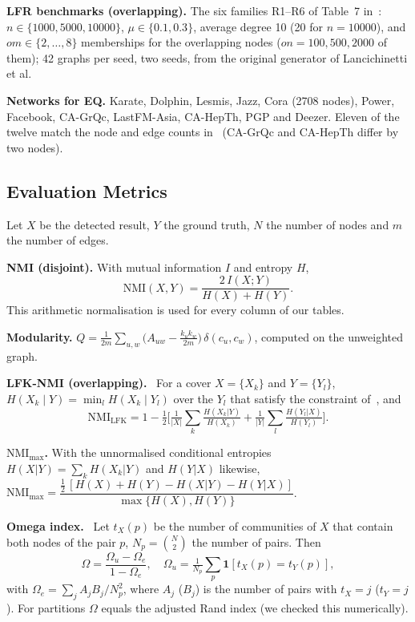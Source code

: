 \documentclass[conference]{IEEEtran}
\begin{document}
\textbf{LFR benchmarks (overlapping).} The six families R1--R6 of Table~7 in~\cite{kong2026}: $n\in\{1000,5000,10000\}$, $\mu\in\{0.1,0.3\}$, average degree 10 (20 for $n=10000$), and $om\in\{2,\dots,8\}$ memberships for the overlapping nodes ($on=100,500,2000$ of them); 42 graphs per seed, two seeds, from the original generator of Lancichinetti et al.

\textbf{Networks for EQ.} Karate, Dolphin, Lesmis, Jazz, Cora (2708 nodes), Power, Facebook, CA-GrQc, LastFM-Asia, CA-HepTh, PGP and Deezer. Eleven of the twelve match the node and edge counts in~\cite{kong2026} (CA-GrQc and CA-HepTh differ by two nodes).

\subsection{Evaluation Metrics}\label{sec:metrics}
Let $X$ be the detected result, $Y$ the ground truth, $N$ the number of nodes and $m$ the number of edges.

\textbf{NMI (disjoint).} With mutual information $I$ and entropy $H$,
\begin{equation}
\mathrm{NMI}(X,Y)=\frac{2\,I(X;Y)}{H(X)+H(Y)}.\label{eq:nmi}
\end{equation}
This arithmetic normalisation is used for every column of our tables.

\textbf{Modularity.} $Q=\frac{1}{2m}\sum_{u,w}\big(A_{uw}-\frac{k_uk_w}{2m}\big)\,\delta(c_u,c_w)$, computed on the unweighted graph.

\textbf{LFK-NMI (overlapping).}~\cite{lfk2009} For a cover $X=\{X_k\}$ and $Y=\{Y_l\}$, $H(X_k\mid Y)=\min_l H(X_k\mid Y_l)$ over the $Y_l$ that satisfy the constraint of~\cite{lfk2009}, and
\begin{equation}
\mathrm{NMI}_{\mathrm{LFK}}=1-\tfrac12\Big[\tfrac{1}{|X|}\sum_k\tfrac{H(X_k|Y)}{H(X_k)}+\tfrac{1}{|Y|}\sum_l\tfrac{H(Y_l|X)}{H(Y_l)}\Big].\label{eq:lfk}
\end{equation}

\textbf{$\mathrm{NMI}_{\max}$.} With the unnormalised conditional entropies $H(X|Y)=\sum_kH(X_k|Y)$ and $H(Y|X)$ likewise, $\mathrm{NMI}_{\max}=\dfrac{\frac12\,[H(X)+H(Y)-H(X|Y)-H(Y|X)]}{\max\{H(X),H(Y)\}}$.

\textbf{Omega index.}~\cite{collins1988} Let $t_X(p)$ be the number of communities of $X$ that contain both nodes of the pair $p$, $N_p=\binom N2$ the number of pairs. Then
\begin{equation}
\Omega=\frac{\Omega_u-\Omega_e}{1-\Omega_e},\quad\Omega_u=\tfrac1{N_p}\sum_p\mathbf 1[t_X(p)=t_Y(p)],
\end{equation}
with $\Omega_e=\sum_jA_jB_j/N_p^2$,
where $A_j$ ($B_j$) is the number of pairs with $t_X=j$ ($t_Y=j$). For partitions $\Omega$ equals the adjusted Rand index (we checked this numerically).
\end{document}
